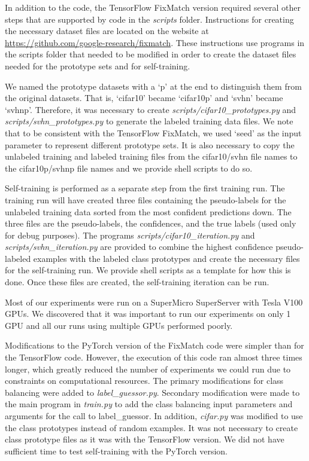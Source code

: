 \documentclass[final]{cvpr}
\begin{document}
In addition to the code, the TensorFlow FixMatch version required several other steps that are supported by code in the \emph{scripts} folder.
Instructions for creating the necessary dataset files are located on the website at \url{https://github.com/google-research/fixmatch}.
These instructions use programs in the scripts folder that needed to be modified in order to create the dataset files needed for the prototype sets and for self-training.

We named the prototype datasets with a `p' at the end to distinguish them from the original datasets.
That is, `cifar10' became `cifar10p' and `svhn' became `svhnp'.
Therefore, it was necessary to create \emph{scripts/cifar10\_prototypes.py} and \emph{scripts/svhn\_prototypes.py} to generate the labeled training data files.
We note that to be consistent with the TensorFlow FixMatch, we used `seed' as the input parameter to represent different prototype sets.
It is also necessary to copy the unlabeled training and labeled training files from the cifar10/svhn file names to the cifar10p/svhnp file names and we provide shell scripts to do so.

Self-training is performed as a separate step from the first training run.
The training run will have created three files containing the pseudo-labels for the unlabeled training data sorted from the most confident predictions down. 
The three files are the pseudo-labels, the confidences, and the true labels (used only for debug purposes).
The programs \emph{scripts/cifar10\_iteration.py} and \emph{scripts/svhn\_iteration.py} are provided to combine the highest confidence pseudo-labeled examples with the labeled class prototypes and create the necessary files for the self-training run.
We provide shell scripts as a template for how this is done.
Once these files are created, the self-training iteration can be run.

Most of our experiments were run on a SuperMicro SuperServer with Tesla V100 GPUs.
We discovered that it was important to run our experiments on only 1 GPU and all our runs using multiple GPUs performed poorly.


Modifications to the PyTorch version of the FixMatch code were simpler than for the TensorFlow code.
However, the execution of this code ran almost three times longer, which greatly reduced the number of experiments we could run due to constraints on computational resources.
The primary modifications for class balancing were added to \emph{label\_guessor.py}.
Secondary modification were made to the main program in \emph{train.py} to add the class balancing input parameters and arguments for the call to label\_guessor.
In addition, \emph{cifar.py} was modified to use the class prototypes instead of random examples.
It was not necessary to create class prototype files as it was with the TensorFlow version.
We did not have sufficient time to test self-training with the PyTorch version.
\end{document}
